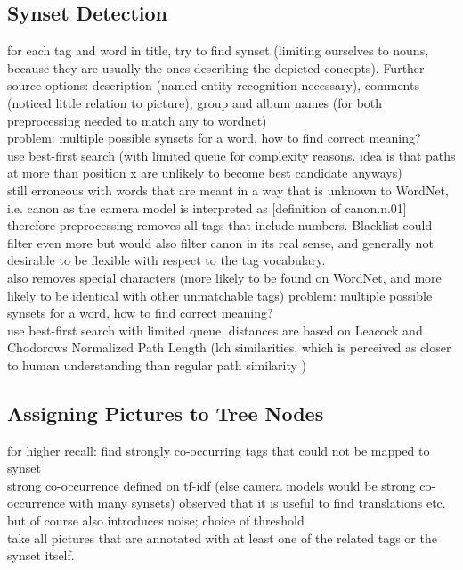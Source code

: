 \subsection{Synset Detection}
for each tag and word in title, try to find synset (limiting ourselves to nouns, because they are usually the ones describing the depicted concepts). Further source options: description (named entity recognition necessary), comments (noticed little relation to picture), group and album names (for both preprocessing needed to match any to wordnet)  \\
problem: multiple possible synsets for a word, how to find correct meaning? \\
use best-first search (with limited queue for complexity reasons. idea is that paths at more than position x are unlikely to become best candidate anyways) \\
still erroneous with words that are meant in a way that is unknown to WordNet, i.e. canon as the camera model is interpreted as [definition of canon.n.01]  \\
therefore preprocessing removes all tags that include numbers. Blacklist could filter even more but would also filter canon in its real sense, and generally not desirable to be flexible with respect to the tag vocabulary.  \\
also removes special characters (more likely to be found on WordNet, and more likely to be identical with other unmatchable tags) 
problem: multiple possible synsets for a word, how to find correct meaning? \\
use best-first search with limited queue, distances are based on Leacock and Chodorows Normalized Path Length (lch similarities, which is perceived as closer to human understanding than regular path similarity \cite{budanitsky01} )

\subsection{Assigning Pictures to Tree Nodes}
for higher recall: find strongly co-occurring tags that could not be mapped to synset \\
strong co-occurrence defined on tf-idf (else camera models would be strong co-occurrence with many synsets)
observed that it is useful to find translations etc. but of course also introduces noise; choice of threshold \\
take all pictures that are annotated with at least one of the related tags or the synset itself.

